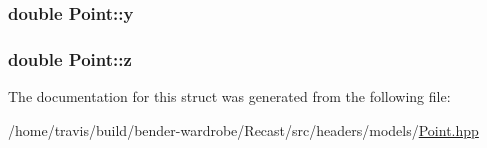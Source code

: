 \hypertarget{struct_point_afa38be143ae800e6ad69ce8ed4df62d8}{
\subsubsection[{y}]{\setlength{\rightskip}{0pt plus 5cm}double Point\-::y}}\label{struct_point_afa38be143ae800e6ad69ce8ed4df62d8}
\hypertarget{struct_point_a05ba3b1dfcb19430582ae953cbbfbded}{
\subsubsection[{z}]{\setlength{\rightskip}{0pt plus 5cm}double Point\-::z}}\label{struct_point_a05ba3b1dfcb19430582ae953cbbfbded}


The documentation for this struct was generated from the following file\-:\begin{DoxyCompactItemize}
\item 
/home/travis/build/bender-\/wardrobe/\-Recast/src/headers/models/\hyperlink{models_2_point_8hpp}{Point.\-hpp}\end{DoxyCompactItemize}
